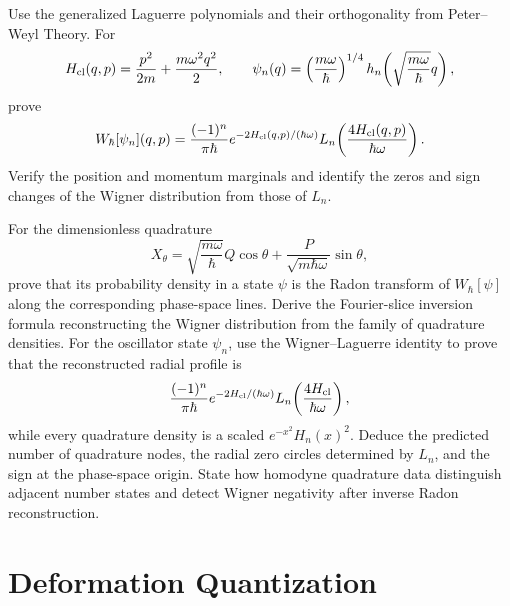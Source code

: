 \begin{exercise}
Use the generalized Laguerre polynomials and their orthogonality from
Peter--Weyl Theory.  For
\[
H_{\rm cl}(q,p)=\frac{p^2}{2m}+\frac{m\omega^2q^2}{2},
\qquad
\psi_n(q)=\left(\frac{m\omega}{\hbar}\right)^{1/4}
h_n\!\left(\sqrt{\frac{m\omega}{\hbar}}q\right),
\]
prove
\[
W_\hbar[\psi_n](q,p)
=\frac{(-1)^n}{\pi\hbar}
e^{-2H_{\rm cl}(q,p)/(\hbar\omega)}
L_n\!\left(\frac{4H_{\rm cl}(q,p)}{\hbar\omega}\right).
\]
Verify the position and momentum marginals and identify the zeros and sign
changes of the Wigner distribution from those of $L_n$.
\end{exercise}


\begin{exercise}
For the dimensionless quadrature
\[
X_\theta=\sqrt{\frac{m\omega}{\hbar}}Q\cos\theta
+\frac{P}{\sqrt{m\hbar\omega}}\sin\theta,
\]
prove that its probability density in a state $\psi$ is the Radon
transform of $W_\hbar[\psi]$ along the corresponding phase-space lines.
Derive the Fourier-slice inversion formula reconstructing the Wigner
distribution from the family of quadrature densities.  For the oscillator
state $\psi_n$, use the Wigner--Laguerre identity to prove that the
reconstructed radial profile is
\[
\frac{(-1)^n}{\pi\hbar}e^{-2H_{\rm cl}/(\hbar\omega)}
L_n\!\left(\frac{4H_{\rm cl}}{\hbar\omega}\right),
\]
while every quadrature density is a scaled
$e^{-x^2}H_n(x)^2$.  Deduce the predicted number of quadrature nodes, the
radial zero circles determined by $L_n$, and the sign at the phase-space
origin.  State how homodyne quadrature data distinguish adjacent number
states and detect Wigner negativity after inverse Radon reconstruction.
\end{exercise}

\section{Deformation Quantization}

